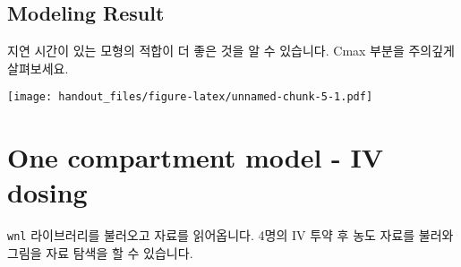 \documentclass[
  9pt,
]{krantz}
\newenvironment{Shaded}{\begin{snugshade}}{\end{snugshade}}
\newcommand{\CommentTok}[1]{\textcolor[rgb]{0.56,0.35,0.01}{\textit{#1}}}
\newcommand{\DataTypeTok}[1]{\textcolor[rgb]{0.13,0.29,0.53}{#1}}
\newcommand{\DecValTok}[1]{\textcolor[rgb]{0.00,0.00,0.81}{#1}}
\newcommand{\FloatTok}[1]{\textcolor[rgb]{0.00,0.00,0.81}{#1}}
\newcommand{\KeywordTok}[1]{\textcolor[rgb]{0.13,0.29,0.53}{\textbf{#1}}}
\newcommand{\NormalTok}[1]{#1}
\newcommand{\OperatorTok}[1]{\textcolor[rgb]{0.81,0.36,0.00}{\textbf{#1}}}
\newcommand{\StringTok}[1]{\textcolor[rgb]{0.31,0.60,0.02}{#1}}
\begin{document}
\hypertarget{modeling-result}{%
\section{Modeling Result}\label{modeling-result}}

지연 시간이 있는 모형의 적합이 더 좋은 것을 알 수 있습니다. Cmax 부분을 주의깊게 살펴보세요.

\begin{Shaded}
\end{Shaded}

\texttt{[image: handout\_files/figure-latex/unnamed-chunk-5-1.pdf]}

\hypertarget{one-compartment-model---iv-dosing}{%
\chapter{One compartment model - IV dosing}\label{one-compartment-model---iv-dosing}}

\texttt{wnl} 라이브러리를 불러오고 자료를 읽어옵니다. 4명의 IV 투약 후 농도 자료를 불러와 그림을 자료 탐색을 할 수 있습니다.
\end{document}
